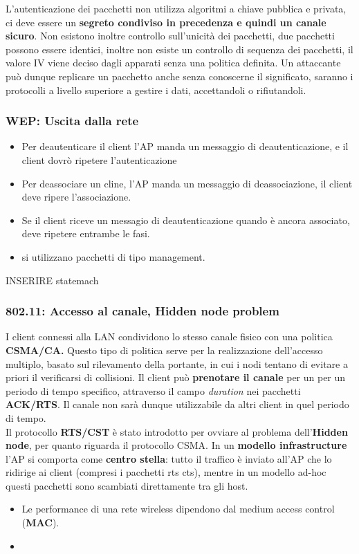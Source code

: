 \documentclass[12pt]{article}
\begin{document}
				L'autenticazione dei pacchetti non utilizza algoritmi a chiave pubblica e privata, ci deve essere un \textbf{segreto condiviso in precedenza e quindi un canale sicuro}. Non esistono inoltre controllo sull'unicità dei pacchetti, due pacchetti possono essere identici, inoltre non esiste un controllo di sequenza dei pacchetti, il valore IV viene deciso dagli apparati senza una politica definita. Un attaccante può dunque replicare un pacchetto anche senza conoscerne il significato, saranno i protocolli a livello superiore a gestire i dati, accettandoli o rifiutandoli.
			\subsubsection{WEP: Uscita dalla rete}
				\begin{itemize}
					\item Per deautenticare il client l'AP manda un messaggio di deautenticazione, e il client dovrò ripetere l'autenticazione
					\item Per deassociare un cline, l'AP manda un messaggio di deassociazione, il client deve ripere l'associazione.
					\item Se il client riceve un messagio di deautenticazione quando è ancora associato, deve ripetere entrambe le fasi.
					\item si utilizzano pacchetti di tipo management.
				\end{itemize}
			
				INSERIRE statemach\\
			
			\subsubsection{802.11: Accesso al canale, Hidden node problem }
				I client connessi alla LAN condividono lo stesso canale fisico con una politica \textbf{CSMA/CA.} Questo tipo di politica serve per la realizzazione dell'accesso multiplo, basato sul rilevamento della portante, in cui i nodi tentano di evitare a priori il verificarsi di collisioni. Il client può \textbf{prenotare il canale} per un per un periodo di tempo specifico, attraverso il campo \textit{duration} nei pacchetti \textbf{ACK/RTS}. Il canale non sarà dunque utilizzabile da altri client in quel periodo di tempo. \\
				Il protocollo \textbf{RTS/CST} è stato introdotto per ovviare al problema dell'\textbf{Hidden node}, per quanto riguarda il protocollo CSMA. In un \textbf{modello infrastructure} l'AP si comporta come \textbf{centro stella}: tutto il traffico è inviato all'AP che lo ridirige ai client (compresi i pacchetti rts cts), mentre in un modello ad-hoc questi pacchetti sono scambiati direttamente tra gli host. 
				\begin{itemize}
					\item Le performance di una rete wireless dipendono dal medium access control (\textbf{MAC}).
					\item  	
				\end{itemize}
				
\end{document}
